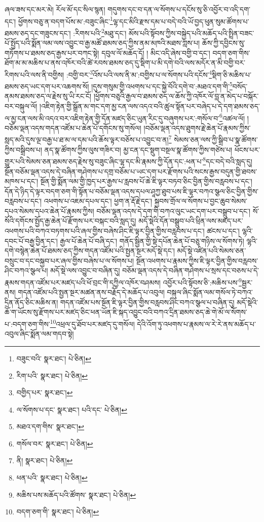 ཞལ་ཟས་དང་མར་མེ། རོལ་མོ་དང་སིལ་སྙན། གདུགས་དང་བ་དན་ལ་སོགས་པ་དངོས་སུ་ཅི་འབྱོར་བ་འདི་དག་དང་། ཕྱོགས་བཅུ་ན་བདག་པོས་མ་:བཟུང་ཞིང་\footnote{བཟུང་བའི་  སྣར་ཐང་།  པེ་ཅིན། }ལྷ་དང་མིའི་རྫས་དམ་པ་བདེ་བའི་ཡོ་བྱད་ཕུན་སུམ་ཚོགས་པ་ཐམས་ཅད་དང་གཟུངས་དང་། :རིགས་པའི་\footnote{རིག་པའི་  སྣར་ཐང་།  པེ་ཅིན། }མཐུ་དང་། མོས་པའི་སྟོབས་ཀྱིས་བསྐྱེད་པའི་མཆོད་པའི་སྤྲིན་བཟང་པོ་སྤྱོད་པའི་སྨོན་ལམ་ལས་འབྱུང་བ་རྒྱ་མཚོ་ཐམས་ཅད་ཀྱིས་ནམ་མཁའི་མཐས་ཀླས་པ། ཆོས་ཀྱི་དབྱིངས་སུ་གཏོགས་པ་ཐམས་ཅད་རྒྱས་པར་བཀང་སྟེ། དབུལ་ལོ་མཆོད་དོ། །
མིང་འདི་ཞེས་བགྱི་བ་དང་། བདག་ཅག་གིས་ཐོག་མ་མ་མཆིས་པ་ནས་འཁོར་བའི་ཚེ་རབས་ཐམས་ཅད་དུ་སྡིག་པ་མི་དགེ་བའི་ལས་མདོར་ན་མི་བགྱི་བར་རིགས་པའི་ལས་ནི་བགྱིས། :བགྱི་བར་\footnote{བགྱིད་པར་  སྣར་ཐང་། }འོས་པའི་ལས་ནི་མ་:བགྱིས་པ་ལ་སོགས་པའི་དངོས་\footnote{ལ་སོགས་པ་དང་  སྣར་ཐང་། པའི་དང་  པེ་ཅིན། }སྡིག་ཅི་མཆིས་པ་ཐམས་ཅད་ཡང་དག་པར་འཆགས་སོ། །དུས་གསུམ་གྱི་འཕགས་པ་དང་སྐྱེ་བོའི་དགེ་བ་:མཐའ་དག་གི་\footnote{མཐའ་དག་གིས་  སྣར་ཐང་། }བསོད་ནམས་ཐམས་ཅད་ལ་རྗེས་སུ་ཡི་རང་ངོ། །ཕྱོགས་བཅུའི་རྒྱལ་བ་ཐམས་ཅད་ལ་ཆོས་ཀྱི་འཁོར་ལོ་བླ་ན་མེད་པ་བསྐོར་བར་བསྐུལ་ལོ། །འཇིག་རྟེན་གྱི་སྒྲོན་མ་གང་དག་མྱ་ངན་ལས་འདའ་བའི་ཚུལ་སྟོན་པར་བཞེད་པ་དེ་དག་ཐམས་ཅད་ལ་མྱ་ངན་ལས་མི་འདའ་བར་འཇིག་རྟེན་གྱི་དོན་མཛད་ཅིང་ཡུན་རིང་དུ་བཞུགས་པར་:གསོལ་བ་\footnote{གསོལ་བར་  སྣར་ཐང་།  པེ་ཅིན། }འཚལ་ལོ། །བཅོམ་ལྡན་འདས་གདན་འཛོམ་པ་ཆེན་པོ་དགོངས་སུ་གསོལ། །བཅོམ་ལྡན་འདས་ཐུགས་རྗེ་ཆེན་པོ་རྣམས་ཀྱིས་སླད་མའི་དུས་ལྔ་བརྒྱ་པ་ཐ་མ་ལ་དམ་པའི་ཆོས་ལྟར་བཅོས་པ་འབྱུང་བ་ན།\footnote{ནི།  སྣར་ཐང་།  པེ་ཅིན། } སེམས་ཅན་ལས་ཀྱི་སྒྲིབ་པ་སྣ་ཚོགས་ཀྱིས་བསྒྲིབས་པ། ནད་སྣ་ཚོགས་ཀྱིས་ལུས་གཟིར་བ། མྱ་ངན་དང་སྡུག་བསྔལ་སྣ་ཚོགས་ཀྱིས་གཙེས་པ། ཕོངས་པར་གྱུར་པའི་སེམས་ཅན་ཐམས་ཅད་རྗེས་སུ་བཟུང་ཞིང་ལྷ་དང་མི་རྣམས་ཀྱི་དོན་དང་:ཕན་པ་\footnote{ཕན་པའི་  སྣར་ཐང་།  པེ་ཅིན། }དང་བདེ་བའི་སླད་དུ། སྔོན་བཅོམ་ལྡན་འདས་དེ་བཞིན་གཤེགས་པ་དགྲ་བཅོམ་པ་ཡང་དག་པར་རྫོགས་པའི་སངས་རྒྱས་བདུན་གྱི་ཐབས་མཁས་པ་དང་། སྔོན་གྱི་སྨོན་ལམ་གྱི་ཁྱད་པར་རྒྱས་པ་རླབས་པོ་ཆེ་ཇི་ལྟར་བཏབ་ཅིང་བྱིན་གྱིས་བརླབས་པ་དང་། དོན་དེ་ཉིད་དེ་ལྟར་བདག་ཅག་གི་སྟོན་པ་བཅོམ་ལྡན་འདས་དཔལ་ཤཱཀྱ་ཐུབ་པས་ཇི་ལྟར་བཀའ་སྩལ་ཅིང་བྱིན་གྱིས་བརླབས་པ་དང་། འཕགས་པ་འཇམ་དཔལ་དང་། ཕྱག་ན་རྡོ་རྗེ་དང་། སྐྱབས་གྲོལ་ལ་སོགས་པ་བྱང་ཆུབ་སེམས་དཔའ་སེམས་དཔའ་ཆེན་པོ་རྣམས་ཀྱིས། བཅོམ་ལྡན་འདས་དེ་དག་གི་བཀའ་ལུང་ཡང་དག་པར་བསྒྲུབ་པ་དང་། སོ་སོའི་དགོངས་སྤྱོད་རྒྱ་ཆེན་པོ་རྫོགས་པར་བསྐང་བའི་སླད་དུ། མདོ་སྡེའི་དོན་བསྒྲུབ་པའི་ཕྲིན་ལས་མཛད་པར་འཕགས་པའི་བཀའ་བཏགས་པའི་ཞལ་གྱིས་བཞེས་ཤིང་ཇི་ལྟར་བྱིན་གྱིས་བརླབས་པ་དང་། ཚངས་པ་དང་། ལྷའི་དབང་པོ་བརྒྱ་བྱིན་དང་། རྒྱལ་པོ་ཆེན་པོ་བཞི་དང་། གནོད་སྦྱིན་གྱི་སྡེ་དཔོན་ཆེན་པོ་བཅུ་གཉིས་ལ་སོགས་ཏེ། ལྷའི་དགེ་བསྙེན་ཆེན་པོ་ཐམས་ཅད་ཀྱིས་གདན་འཛོམ་པའི་སྤྱན་སྔར་མདོ་སྡེ་དང་། མདོ་སྡེ་འཛིན་པའི་སེམས་ཅན་བསྲུང་བ་དང་བསྐྱབ་པར་ཞལ་གྱིས་བཞེས་པ་ལ་སོགས་པ། སྔོན་འཕགས་པ་རྣམས་ཀྱིས་ཇི་ལྟར་བྱིན་གྱིས་བརླབས་ཤིང་བཀའ་སྩལ་པ། མདོ་སྡེ་ལས་འབྱུང་བ་བཞིན་དུ། བཅོམ་ལྡན་འདས་དེ་བཞིན་གཤེགས་པ་སྲས་དང་བཅས་པ་དེ་རྣམས་གདན་འཛོམ་པར་མཛད་པའི་ཕོ་བྲང་གི་དཀྱིལ་འཁོར་བཤམས། འབྱོར་པའི་སྟོབས་ཅི་:མཆིས་པས་\footnote{མཆིས་པས་མཆོད་པའི་ཚོགས་  སྣར་ཐང་།  པེ་ཅིན། }སྦྱར་ནས། གདན་འཛོམ་པའི་སྤྱན་སྔར་མཚན་ནས་བརྗོད་དེ་མཆོད་པ་འབུལ། བསྐུལ་ཞིང་སྨོན་ལམ་གསོལ་ཏེ་བཀའ་དྲིན་ནོད་ཅིང་མཆིས་ན། གདན་འཛོམ་པས་སྔོན་ཇི་ལྟར་བྱིན་གྱིས་བརླབས་ཤིང་བཀའ་སྩལ་པ་བཞིན་དུ། མདོ་སྡེའི་ཆོ་ག་ཡོངས་སུ་རྫོགས་པར་མཛད་ཅིང་ཕན་ཡོན་ཇི་སྐད་འབྱུང་བའི་བཀའ་དྲིན་ཐམས་ཅད་ཆེ་གེ་མོ་ལ་སོགས་པ་:བདག་ཅག་གིས་\footnote{བདག་ཅག་གི་  སྣར་ཐང་།  པེ་ཅིན། }འཕྲལ་དུ་ཐོབ་པར་མཛད་དུ་གསོལ། དེའི་འོག་ཏུ་འཕགས་པ་རྣམས་ལ་རེ་རེ་ནས་མཆོད་པ་འབུལ་ཞིང་སྨོན་ལམ་གདབ་སྟེ། 